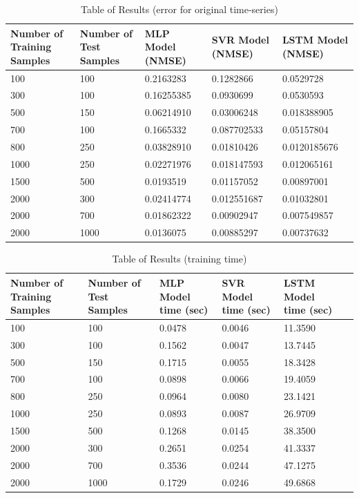 \documentclass{article}
\begin{document}
\begin{table}[htb!]
	\centering
	\begin{tabular}{p{2cm} p{2cm} p{2cm} p{2cm} p{2cm}}
		\toprule
		Number of Training Samples & Number of Test Samples & MLP Model (NMSE) & SVR Model (NMSE) & LSTM Model (NMSE) \\
		\midrule
		100 & 100 & 0.2163283 & 0.1282866 & 0.0529728 \\
		\midrule
		300 & 100 & 0.16255385 & 0.0930699 & 0.0530593 \\ 
		\midrule
		500 & 150 & 0.06214910 & 0.03006248 & 0.018388905 \\
		\midrule
		700 & 100 & 0.1665332 & 0.087702533 & 0.05157804 \\
		\midrule
		800 & 250 & 0.03828910 & 0.01810426 & 0.0120185676 \\
		\midrule
		1000 & 250 & 0.02271976  & 0.018147593 & 0.012065161 \\
		\midrule
		1500 & 500 & 0.0193519 & 0.01157052 & 0.00897001 \\
		\midrule
		2000 & 300 & 0.02414774 & 0.012551687 & 0.01032801 \\
		\midrule
		2000 & 700 & 0.01862322 &  0.00902947 & 0.007549857 \\
		\midrule
		2000 & 1000 & 0.0136075 & 0.00885297 & 0.00737632 \\
		\bottomrule
	\end{tabular} \caption{Table of Results (error for original time-series)}
\end{table}

\begin{table}[htb!]
	\centering
	\begin{tabular}{p{2cm} p{2cm} p{2cm} p{2cm} p{2cm} p{2cm}}
		\toprule
		Number of Training Samples & Number of Test Samples & MLP Model time (sec) & SVR Model time (sec) & LSTM Model time (sec) \\
		\midrule
		100 & 100 & 0.0478 & 0.0046 & 11.3590 \\
		\midrule
		300 & 100 & 0.1562 & 0.0047 & 13.7445 \\
		\midrule
		500 & 150 & 0.1715 & 0.0055 & 18.3428 \\
		\midrule
		700 & 100 & 0.0898 & 0.0066 & 19.4059 \\
		\midrule
		800 & 250 & 0.0964 & 0.0080 & 23.1421 \\
		\midrule
		1000 & 250 & 0.0893 & 0.0087 & 26.9709 \\
		\midrule
		1500 & 500 & 0.1268 & 0.0145 & 38.3500 \\
		\midrule
		2000 & 300 & 0.2651 & 0.0254 & 41.3337 \\
		\midrule
		2000 & 700 & 0.3536 & 0.0244 & 47.1275 \\
		\midrule
		2000 & 1000 & 0.1729 & 0.0246 & 49.6868 \\
		\bottomrule
	\end{tabular}
	\caption{Table of Results (training time)}
\end{table}
\end{document}
